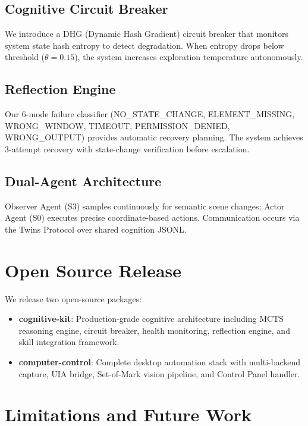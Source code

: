 \documentclass{article}
\begin{document}
\subsection{Cognitive Circuit Breaker}

We introduce a DHG (Dynamic Hash Gradient) circuit breaker that monitors system state hash entropy to detect degradation. When entropy drops below threshold ($\theta = 0.15$), the system increases exploration temperature autonomously.

\subsection{Reflection Engine}

Our 6-mode failure classifier (NO\_STATE\_CHANGE, ELEMENT\_MISSING, WRONG\_WINDOW, TIMEOUT, PERMISSION\_DENIED, WRONG\_OUTPUT) provides automatic recovery planning. The system achieves 3-attempt recovery with state-change verification before escalation.

\subsection{Dual-Agent Architecture}

Observer Agent (S3) samples continuously for semantic scene changes; Actor Agent (S0) executes precise coordinate-based actions. Communication occurs via the Twins Protocol over shared cognition JSONL.

\section{Open Source Release}

We release two open-source packages:

\begin{itemize}
    \item \textbf{cognitive-kit}: Production-grade cognitive architecture including MCTS reasoning engine, circuit breaker, health monitoring, reflection engine, and skill integration framework. 
    \item \textbf{computer-control}: Complete desktop automation stack with multi-backend capture, UIA bridge, Set-of-Mark vision pipeline, and Control Panel handler.
\end{itemize}

\section{Limitations and Future Work}
\end{document}
